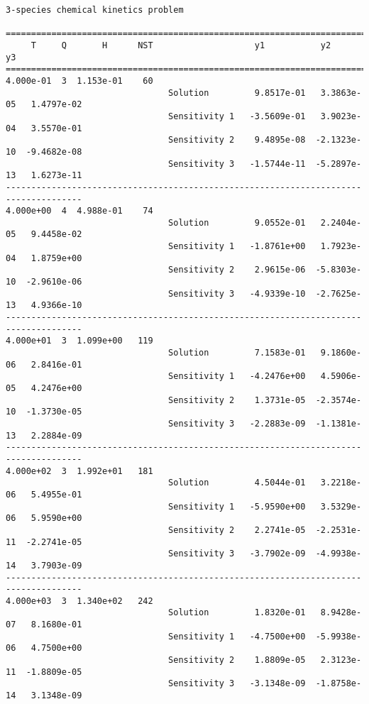 \begin{verbatim}
3-species chemical kinetics problem

=====================================================================================
     T     Q       H      NST                    y1           y2           y3    
=====================================================================================
4.000e-01  3  1.153e-01    60
                                Solution         9.8517e-01   3.3863e-05   1.4797e-02 
                                Sensitivity 1   -3.5609e-01   3.9023e-04   3.5570e-01 
                                Sensitivity 2    9.4895e-08  -2.1323e-10  -9.4682e-08 
                                Sensitivity 3   -1.5744e-11  -5.2897e-13   1.6273e-11 
-------------------------------------------------------------------------------------
4.000e+00  4  4.988e-01    74
                                Solution         9.0552e-01   2.2404e-05   9.4458e-02 
                                Sensitivity 1   -1.8761e+00   1.7923e-04   1.8759e+00 
                                Sensitivity 2    2.9615e-06  -5.8303e-10  -2.9610e-06 
                                Sensitivity 3   -4.9339e-10  -2.7625e-13   4.9366e-10 
-------------------------------------------------------------------------------------
4.000e+01  3  1.099e+00   119
                                Solution         7.1583e-01   9.1860e-06   2.8416e-01 
                                Sensitivity 1   -4.2476e+00   4.5906e-05   4.2476e+00 
                                Sensitivity 2    1.3731e-05  -2.3574e-10  -1.3730e-05 
                                Sensitivity 3   -2.2883e-09  -1.1381e-13   2.2884e-09 
-------------------------------------------------------------------------------------
4.000e+02  3  1.992e+01   181
                                Solution         4.5044e-01   3.2218e-06   5.4955e-01 
                                Sensitivity 1   -5.9590e+00   3.5329e-06   5.9590e+00 
                                Sensitivity 2    2.2741e-05  -2.2531e-11  -2.2741e-05 
                                Sensitivity 3   -3.7902e-09  -4.9938e-14   3.7903e-09 
-------------------------------------------------------------------------------------
4.000e+03  3  1.340e+02   242
                                Solution         1.8320e-01   8.9428e-07   8.1680e-01 
                                Sensitivity 1   -4.7500e+00  -5.9938e-06   4.7500e+00 
                                Sensitivity 2    1.8809e-05   2.3123e-11  -1.8809e-05 
                                Sensitivity 3   -3.1348e-09  -1.8758e-14   3.1348e-09 

\end{verbatim}
